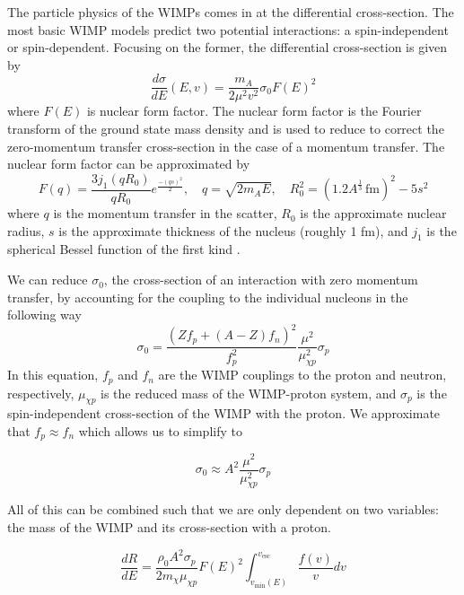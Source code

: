 The particle physics of the WIMPs comes in at the differential cross-section.  The most basic WIMP models predict two potential interactions: a spin-independent or spin-dependent.  Focusing on the former, the differential cross-section is given by
%
\begin{equation}
        \frac{d \sigma}{dE}(E, v) = \frac{m_A}{2 \mu^2 v^2} \sigma_0 F(E)^2
\end{equation}
%
where $F(E)$ is nuclear form factor.  The nuclear form factor is the Fourier transform of the ground state mass density and is used to reduce to correct the zero-momentum transfer cross-section in the case of a momentum transfer.  The nuclear form factor can be approximated by
%
\begin{equation}
        F(q) = \frac{3 j_1(q R_0)}{q R_0} e^{\frac{-(qs)^2}{2}}, \quad q=\sqrt{2 m_A E}, \quad R_0^2 = \left( 1.2A^{\frac{1}{3}} \, \textrm{fm} \right)^{2} - 5s^2
\end{equation}
%
where $q$ is the momentum transfer in the scatter, $R_0$ is the approximate nuclear radius, $s$ is the approximate thickness of the nucleus (roughly 1 fm), and $j_1$ is the spherical Bessel function of the first kind \cite{engel1991nuclear}.  

We can reduce $\sigma_0$, the cross-section of an interaction with zero momentum transfer, by accounting for the coupling to the individual nucleons in the following way
%
\begin{equation}
        \sigma_0 = \frac{\left( Z f_p + (A-Z)f_n \right)^2}{f_p^2} \frac{\mu^2}{\mu^2_{\chi p}} \sigma_p
\end{equation}
%
In this equation, $f_p$ and $f_n$ are the WIMP couplings to the proton and neutron, respectively, $\mu_{\chi p}$ is the reduced mass of the WIMP-proton system, and $\sigma_p$ is the spin-independent cross-section of the WIMP with the proton.  We approximate that $f_p \approx f_n$ which allows us to simplify to

\begin{equation}
        \sigma_0 \approx A^2 \frac{\mu^2}{\mu^2_{\chi p}} \sigma_p
\end{equation}

All of this can be combined such that we are only dependent on two variables: the mass of the WIMP and its cross-section with a proton.

\begin{equation}
        \frac{dR}{dE} = \frac{\rho_0 A^2 \sigma_p}{2 m_{\chi} \mu_{\chi p}} F(E)^2 \int_{v_{\textrm{min}}(E)}^{v_{\textrm{esc}}}  \frac{f(v)}{v} dv
\end{equation}


